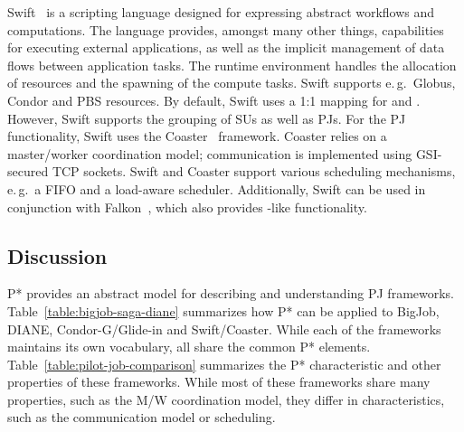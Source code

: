 \documentclass[conference]{IEEEtran}
\begin{document}
Swift~\cite{Wilde2011} is a scripting language designed for expressing
abstract workflows and computations. The language provides, amongst many other
things, capabilities for executing external applications, as well as the
implicit management of data flows between application tasks. 
The runtime environment handles the allocation of resources and the spawning of 
the compute tasks. 
Swift supports e.\,g.\ Globus, Condor and PBS resources. 
By default, Swift uses a 1:1 mapping for \cus and \sus. However,
Swift supports the grouping of SUs as well as PJs. For the PJ functionality, Swift uses the
Coaster~\cite{coasters} framework. Coaster relies on a master/worker
coordination model; communication is implemented using GSI-secured TCP sockets.
Swift and Coaster support various scheduling mechanisms, e.\,g.\ a FIFO and a
load-aware scheduler. Additionally, Swift can be used in conjunction with 
Falkon~\cite{1362680}, which also provides \pilot-like functionality.


\subsection{Discussion}


P* provides an abstract model for describing and understanding PJ
frameworks. Table~\ref{table:bigjob-saga-diane} summarizes how P* can
be applied to BigJob, DIANE, Condor-G/Glide-in and Swift/Coaster. While each of 
the frameworks maintains its own vocabulary, all share the common P* elements. 
Table~\ref{table:pilot-job-comparison} summarizes the P* characteristic and 
other properties of these frameworks. While most of these frameworks share many 
properties, such as the M/W coordination model, they differ in characteristics, 
such as the communication model or scheduling.
\end{document}
